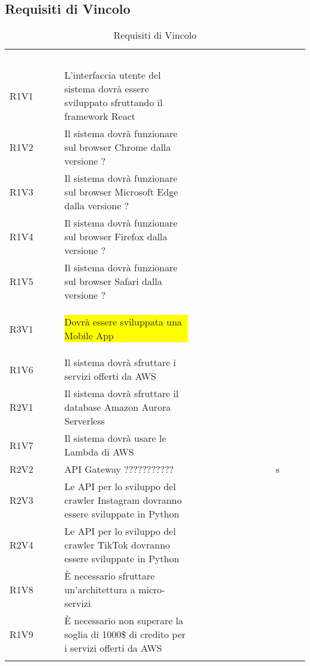 \subsection{Requisiti di Vincolo}


\renewcommand{\arraystretch}{1.5}
\begin{longtable}{ m{}<{\centering}  m{}<{\centering}  m{}<{\centering}  m{}<{\centering}}
	\rowcolor{darkblue}
	\textcolor{white}{\textbf{Requisito}} &\textcolor{white}{\textbf{Descrizione}}& \textcolor{white}{\textbf{Classificazione}} & \textcolor{white}{\textbf{Fonti}}\\ 

	R1V1 & L’interfaccia utente del sistema dovrà essere sviluppato sfruttando il framework React & \Ob & \Vi \\	

	R1V2 & Il sistema dovrà funzionare sul browser Chrome dalla versione ? & \Ob & \Vi \\	
	 
	R1V3 & Il sistema dovrà funzionare sul browser Microsoft Edge dalla versione ? & \Ob & \Vi \\	

	R1V4 & Il sistema dovrà funzionare sul browser Firefox dalla versione ? & \Ob & \Vi \\	
	 
	R1V5 & Il sistema dovrà funzionare sul browser Safari dalla versione ? & \Ob & \Vi \\	
	 
	R3V1 & {\colorbox{yellow}{\parbox{0.35\textwidth}{Dovrà essere sviluppata una Mobile App}}} & \Fa & \Ca \\	
	 
	R1V6 & Il sistema dovrà sfruttare i servizi offerti da AWS & \Ob & \Ca \\	
	 
	R2V1 & Il sistema dovrà sfruttare il database Amazon Aurora Serverless & \De & \Vi \\
	
	R1V7 & Il sistema dovrà usare le Lambda di AWS & \Ob & \Ca \\	
	 
	R2V2 & API Gateway ??????????? & \De & s\\	 

	R2V3 & Le API per lo sviluppo del crawler Instagram dovranno essere sviluppate in Python & \De & \Vi \\	
	 
	R2V4 & Le API per lo sviluppo del crawler TikTok dovranno essere sviluppate in Python & \De & \Vi \\	
	 
	R1V8 & È necessario sfruttare un’architettura a micro-servizi & \Ob & \Ca \\	
	 
	R1V9 & È necessario non superare la soglia di 1000\$ di credito per i servizi offerti da AWS & \Ob & \Ve \\	
	
	\hiderowcolors \caption{Requisiti di Vincolo}
\end{longtable}

\pagebreak